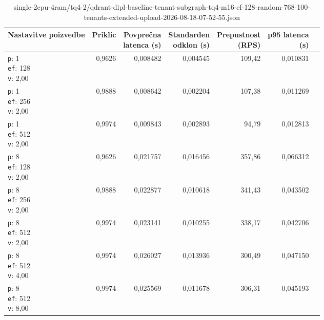 \begin{table}[htbp]
  \centering
\small
  \caption{single-2cpu-4ram/tq4-2/qdrant-dipl-baseline-tenant-subgraph-tq4-m16-ef-128-random-768-100-tenants-extended-upload-2026-08-18-07-52-55.json}
  \label{tab:single-2cpu-4ram:tq4-2:qdrant-dipl-baseline-tenant-subgraph-tq4-m16-ef-128-random-768-100-tenants-extended-upload-2026-08-18-07-52-55.json}
  \begin{tabularx}{\textwidth}{Xrrrrrr}
    \toprule
    Nastavitve poizvedbe & Priklic & \makecell{Povprečna\\latenca (s)} & \makecell{Standarden\\odklon (s)} & \makecell{Prepustnost\\(RPS)} & \makecell{p95 latenca\\(s)}  \\
    \midrule
    \makecell{\texttt{p}: 1\\\texttt{ef}: 128\\\texttt{v}: 2,00} & 0,9626 & 0,008482 & 0,004545 & 109,42 & 0,010831 \\
    \makecell{\texttt{p}: 1\\\texttt{ef}: 256\\\texttt{v}: 2,00} & 0,9888 & 0,008642 & 0,002204 & 107,38 & 0,011269 \\
    \makecell{\texttt{p}: 1\\\texttt{ef}: 512\\\texttt{v}: 2,00} & 0,9974 & 0,009843 & 0,002893 & 94,79 & 0,012813 \\
    \makecell{\texttt{p}: 8\\\texttt{ef}: 128\\\texttt{v}: 2,00} & 0,9626 & 0,021757 & 0,016456 & 357,86 & 0,066312 \\
    \makecell{\texttt{p}: 8\\\texttt{ef}: 256\\\texttt{v}: 2,00} & 0,9888 & 0,022877 & 0,010618 & 341,43 & 0,043502 \\
    \makecell{\texttt{p}: 8\\\texttt{ef}: 512\\\texttt{v}: 2,00} & 0,9974 & 0,023141 & 0,010255 & 338,17 & 0,042706 \\
    \makecell{\texttt{p}: 8\\\texttt{ef}: 512\\\texttt{v}: 4,00} & 0,9974 & 0,026027 & 0,013936 & 300,49 & 0,047150 \\
    \makecell{\texttt{p}: 8\\\texttt{ef}: 512\\\texttt{v}: 8,00} & 0,9974 & 0,025569 & 0,011678 & 306,31 & 0,045193 \\

\end{tabularx}
\end{table}

